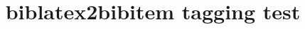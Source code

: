 \documentclass{article}
\title{biblatex2bibitem tagging test}
\begin{document}
\cite{sigfridsson,knuth:ct:e}

\printbibliography

\printbibitembibliography
\end{document}
